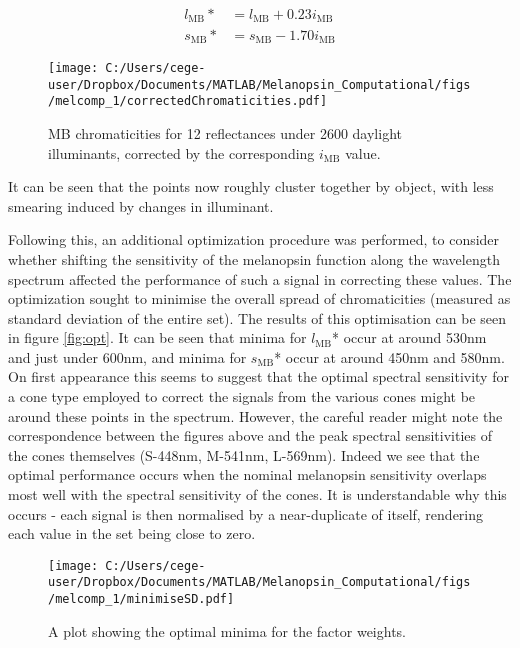 \begin{subequations} \label{eq:correction}
\begin{align}
l_{\text{MB}}* &= l_{\text{MB}} + 0.23i_{\text{MB}}\\
s_{\text{MB}}* &= s_{\text{MB}} - 1.70i_{\text{MB}}
\end{align}
\end{subequations}

\begin{figure}[h]
    \centering
    \texttt{[image: C:/Users/cege-user/Dropbox/Documents/MATLAB/Melanopsin\_Computational/figs/melcomp\_1/correctedChromaticities.pdf]}
    \caption{\ac{MB} chromaticities for 12 reflectances under 2600 daylight illuminants, corrected by the corresponding $i_{\text{MB}}$ value.}
    \label{fig:corrected}
\end{figure} 

It can be seen that the points now roughly cluster together by object, with less smearing induced by changes in illuminant.

Following this, an additional optimization procedure was performed, to consider whether shifting the sensitivity of the melanopsin function along the wavelength spectrum affected the performance of such a signal in correcting these values. The optimization sought to minimise the overall spread of chromaticities (measured as standard deviation of the entire set). The results of this optimisation can be seen in figure \ref{fig:opt}. It can be seen that minima for $l_{\text{MB}}$* occur at around 530nm and just under 600nm, and minima for $s_{\text{MB}}$* occur at around 450nm and 580nm. On first appearance this seems to suggest that the optimal spectral sensitivity for a cone type employed to correct the signals from the various cones might be around these points in the spectrum. However, the careful reader might note the correspondence between the figures above and the peak spectral sensitivities of the cones themselves (S-448nm, M-541nm, L-569nm). Indeed we see that the optimal performance occurs when the nominal melanopsin sensitivity overlaps most well with the spectral sensitivity of the cones. It is understandable why this occurs - each signal is then normalised by a near-duplicate of itself, rendering each value in the set being close to zero.

\begin{figure}[h]
    \centering
    \texttt{[image: C:/Users/cege-user/Dropbox/Documents/MATLAB/Melanopsin\_Computational/figs/melcomp\_1/minimiseSD.pdf]}
    \caption{A plot showing the optimal minima for the factor weights.}
    \label{fig:minSD}
\end{figure} 


